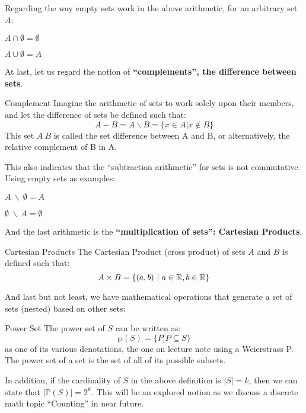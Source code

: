 Regarding the way empty sets work in the above arithmetic, for an arbitrary set $A$:
\begin{bindenum}
    \item $A \cap \emptyset = \emptyset$
    \item $A \cup \emptyset = A$
\end{bindenum}
At last, let us regard the notion of \textbf{``complements'', the difference between sets}.
\begin{ln-define}{Complement}{}
    Imagine the arithmetic of sets to work solely upon their members, and let the difference of sets be defined such that:
    \[A - B = A \backslash B = \{x \in A | x \notin B\}\]
    This set $A \ B$ is called the set difference between A and B, or alternatively, the relative complement of B in A.
\end{ln-define}
This also indicates that the ``subtraction arithmetic'' for sets is not commutative. Using empty sets as examples:
\begin{bindenum}
    \item $A\ \backslash\ \emptyset = A$
    \item $\emptyset\ \backslash\ A = \emptyset$
\end{bindenum}
And the last arithmetic is the \textbf{``multiplication of sets'': Cartesian Products}.
\begin{ln-define}{Cartesian Products}{}
    The Cartesian Product (cross product) of sets $A$ and $B$ is defined such that:
    \[A \times B = \{(a, b)\ |\ a \in \mathbb{R}, b \in \mathbb{R}\}\]
\end{ln-define}
And last but not least, we have mathematical operations that generate a set of sets (nested) based on other sets:
\begin{ln-define}{Power Set}{}
    The power set of $S$ can be written as:
    \[\wp (S) = \{P | P \subseteq S\}\]
    as one of its various denotations, the one on lecture note using a Weierstrass P. \\
    The power set of a set is the set of all of its possible subsets.
\end{ln-define}
In addition, if the cardinality of $S$ in the above definition is $|S| = k$, then we can state that $|\mathbb{P} (S)| = 2^k$. This will be an explored notion as we discuss a discrete math topic ``Counting'' in near future.
